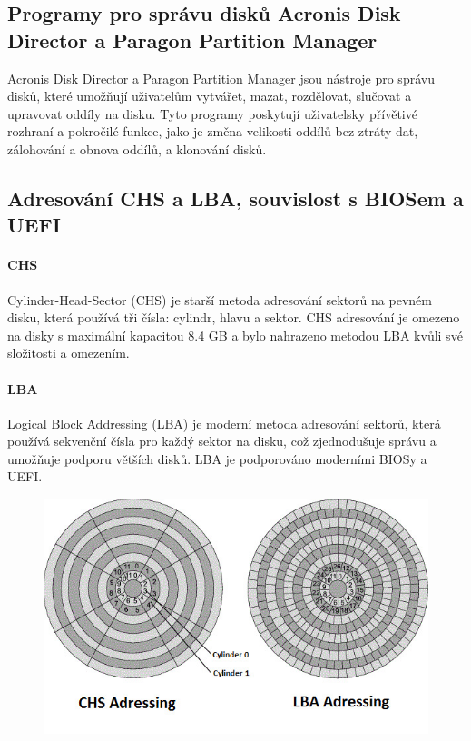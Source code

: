 \subsection{Programy pro správu disků Acronis Disk Director a Paragon Partition Manager}
Acronis Disk Director a Paragon Partition Manager jsou nástroje pro správu disků, které umožňují uživatelům vytvářet, mazat, rozdělovat, slučovat a upravovat oddíly na disku. Tyto programy poskytují uživatelsky přívětivé rozhraní a pokročilé funkce, jako je změna velikosti oddílů bez ztráty dat, zálohování a obnova oddílů, a klonování disků.

\subsection{Adresování CHS a LBA, souvislost s BIOSem a UEFI}
\paragraph{CHS}
Cylinder-Head-Sector (CHS) je starší metoda adresování sektorů na pevném disku, která používá tři čísla: cylindr, hlavu a sektor. CHS adresování je omezeno na disky s maximální kapacitou 8.4 GB a bylo nahrazeno metodou LBA kvůli své složitosti a omezením.

\paragraph{LBA}
Logical Block Addressing (LBA) je moderní metoda adresování sektorů, která používá sekvenční čísla pro každý sektor na disku, což zjednodušuje správu a umožňuje podporu větších disků. LBA je podporováno moderními BIOSy a UEFI.

\begin{figure}[h]
\centering
\includegraphics[scale=0.3]{sections/14_org_struk_pev_disk_op_sys_win/images/chs_lba-890647175.jpg}
\end{figure}


